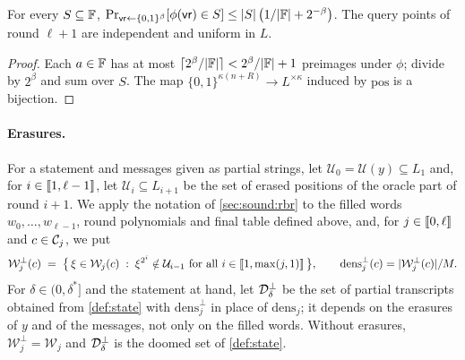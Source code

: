 \begin{lemma}[Sampling]\label{lem:sampling}
For every $S \subseteq \mathbb{F}$, $\Pr_{\mathsf{vr} \leftarrow \{0,1\}^\beta}[\phi(\mathsf{vr}) \in S] \le |S|\,\bigl(1/|\mathbb{F}| + 2^{-\beta}\bigr)$.
The query points of round $\ell+1$ are independent and uniform in $L$.
\end{lemma}

\begin{proof}
Each $a \in \mathbb{F}$ has at most $\lceil 2^\beta/|\mathbb{F}| \rceil < 2^\beta/|\mathbb{F}| + 1$ preimages under $\phi$; divide by $2^\beta$ and sum over $S$.
The map $\{0,1\}^{\kappa(n+R)} \to L^{\times\kappa}$ induced by $\mathrm{pos}$ is a bijection.
\end{proof}

\paragraph{Erasures.}
For a statement and messages given as partial strings, let $\mathcal{U}_0 = \mathcal{U}(y) \subseteq L_1$ and, for $i \in \llbracket 1, \ell-1 \rrbracket$, let $\mathcal{U}_i \subseteq L_{i+1}$ be the set of erased positions of the oracle part of round $i+1$.
We apply the notation of \cref{sec:sound:rbr} to the filled words $w_0, \dots, w_{\ell-1}$, round polynomials and final table defined above, and, for $j \in \llbracket 0, \ell \rrbracket$ and $c \in \mathcal{C}_j$, we put
\[
  \mathcal{W}^{\bot}_j(c) \;=\; \bigl\{\, \xi \in \mathcal{W}_j(c) \;:\; \xi^{2^{i}} \notin \mathcal{U}_{i-1} \text{ for all } i \in \llbracket 1, \max(j,1) \rrbracket \,\bigr\}, \qquad \mathrm{dens}^{\bot}_j(c) = |\mathcal{W}^{\bot}_j(c)|/M.
\]
For $\delta \in (0,\delta^*]$ and the statement at hand, let $\mathcal{D}^{\bot}_\delta$ be the set of partial transcripts obtained from \cref{def:state} with $\mathrm{dens}^{\bot}_j$ in place of $\mathrm{dens}_j$; it depends on the erasures of $y$ and of the messages, not only on the filled words.
Without erasures, $\mathcal{W}^{\bot}_j = \mathcal{W}_j$ and $\mathcal{D}^{\bot}_\delta$ is the doomed set of \cref{def:state}.


